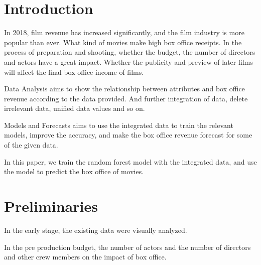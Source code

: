 \section{Introduction}
\label{sec-intro}
In 2018, film revenue has increased significantly, and the film industry is more popular than ever.
What kind of movies make high box office receipts. In the process of preparation and shooting, 
whether the budget, the number of directors and actors have a great impact. Whether the publicity and 
preview of later films will affect the final box office income of films.

Data Analysis aims to show the relationship between attributes and box office revenue 
according to the data provided. And further integration of data, delete irrelevant data, 
unified data values and so on.

Models and Forecasts aims to use the integrated data to train the relevant models, 
improve the accuracy, and make the box office revenue forecast for some of the given data.

In this paper, we train the random forest model with the integrated data, 
and use the model to predict the box office of movies.
\section{Preliminaries} \label{sec-preliminaries}
In the early stage, the existing data were visually analyzed.

In the pre production budget, the number of actors and the number of directors and other crew members on the impact of box office.

